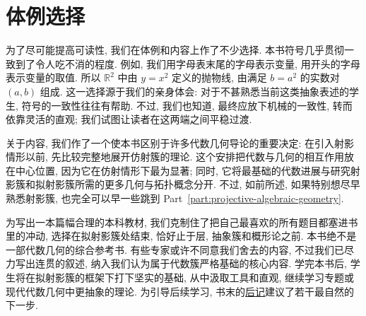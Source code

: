 \section*{体例选择}

为了尽可能提高可读性, 我们在体例和内容上作了不少选择. 本书符号几乎贯彻一致到了令人吃不消的程度. 例如, 我们用字母表末尾的字母表示变量, 用开头的字母表示变量的取值. 所以 $\mathbb{R}^{2}$ 中由 $y=x^{2}$ 定义的抛物线, 由满足 $b=a^{2}$ 的实数对 $(a,b)$ 组成. 这一选择源于我们的亲身体会: 对于不甚熟悉当前这类抽象表述的学生, 符号的一致性往往有帮助. 不过, 我们也知道, 最终应放下机械的一致性, 转而依靠灵活的直观; 我们试图让读者在这两端之间平稳过渡.

关于内容, 我们作了一个使本书区别于许多代数几何导论的重要决定: 在引入射影情形以前, 先比较完整地展开仿射簇的理论. 这个安排把代数与几何的相互作用放在中心位置, 因为它在仿射情形下最为显著; 同时, 它将最基础的代数进展与研究射影簇和拟射影簇所需的更多几何与拓扑概念分开. 不过, 如前所述, 如果特别想尽早熟悉射影簇, 也完全可以早一些跳到 Part~\ref{part:projective-algebraic-geometry}.

为写出一本篇幅合理的本科教材, 我们克制住了把自己最喜欢的所有题目都塞进书里的冲动, 选择在拟射影簇处结束, 恰好止于层, 抽象簇和概形论之前. 本书绝不是一部代数几何的综合参考书. 有些专家或许不同意我们舍去的内容, 不过我们已尽力写出连贯的叙述, 纳入我们认为属于代数簇严格基础的核心内容. 学完本书后, 学生将在拟射影簇的框架下打下坚实的基础, 从中汲取工具和直观, 继续学习专题或现代代数几何中更抽象的理论. 为引导后续学习, 书末的\hyperref[chap:coda]{后记}建议了若干最自然的下一步.

